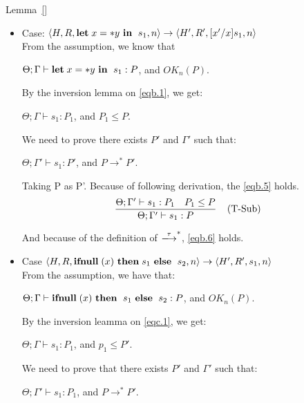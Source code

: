 \begin{pfof}{Lemma~\ref{}}
\begin{itemize}
And because of the definition of $\xlongrightarrow{\tau}^{*}$, the \eqref{eqa.6} holds. \\

\item Case: $\langle H, R, \mathbf{let}\; x = *y \  \mathbf{in}\; \  s_{1}, n \rangle \rightarrow \langle H', R', [x'/x]s_{1}, n \rangle $\\

From the assumption, we know that
\begin{center}
$\Theta; \Gamma \vdash \mathbf{let}\; x = *y \  \mathbf{in}\; \  s_{1} : P$, and $OK_{n}(P)$.
\end{center}

By the inversion lemma on \eqref{eqb.1}, we get:
\begin{center}
$\Theta; \Gamma \vdash s_{1} : P_{1}$, and $P_{1} \le P$.
\end{center}

We need to prove there exists $P'$ and $\Gamma'$ such that:
\begin{center}
$\Theta; \Gamma' \vdash s_{1} : P'$, and $P \rightarrow^{*} P'$.
\end{center}

Taking P as P'. Because of  following derivation, the \eqref{eqb.5} holds.
$$
   \frac{\Theta; \Gamma' \vdash s_{1} : P_{1} \ \ \ P_{1} \le P}
   {\Theta; \Gamma' \vdash s_{1} : P}
   \; \; \; \; \mbox{(T-Sub)}
$$

And because of the definition of $\xlongrightarrow{\tau}^{*}$, \eqref{eqb.6} holds. \\

\item Case $\langle H, R, \mathbf{ifnull}\; (x) \  \mathbf{then}\; s_{1} \  \mathbf{else}\; \  s_{2}, n \rangle \rightarrow \langle H', R',s_{1}, n \rangle $\\

From the assumption, we have that:
\begin{center}
$\Theta; \Gamma \vdash \mathbf{ifnull}\; (x) \  \mathbf{then}\; \  s_{1} \ \mathbf{else}\; \ s_{2} : P$, and $OK_{n}(P)$.
\end{center}

By the inversion leamma on \eqref{eqc.1}, we get:
\begin{center}
$\Theta; \Gamma \vdash s_{1} : P_{1}$, and $ p_{1} \le P'$.
\end{center}

We need to prove that there exists $P'$ and $\Gamma'$ such that:
\begin{center}
 $\Theta; \Gamma' \vdash s_{1} : P_{1}$, and $P \rightarrow^{*} P'$.
\end{center}


\end{itemize}
\end{pfof}
